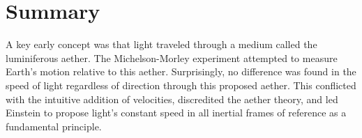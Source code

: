 




\section{Summary}

A key early concept was that light traveled through a medium called the luminiferous aether.
The Michelson-Morley experiment attempted to measure Earth's motion relative to this aether.
Surprisingly, no difference was found in the speed of light regardless of direction through this proposed aether.
This conflicted with the intuitive addition of velocities, discredited the aether theory, and led Einstein to propose light's constant speed in all inertial frames of reference as a fundamental principle.

